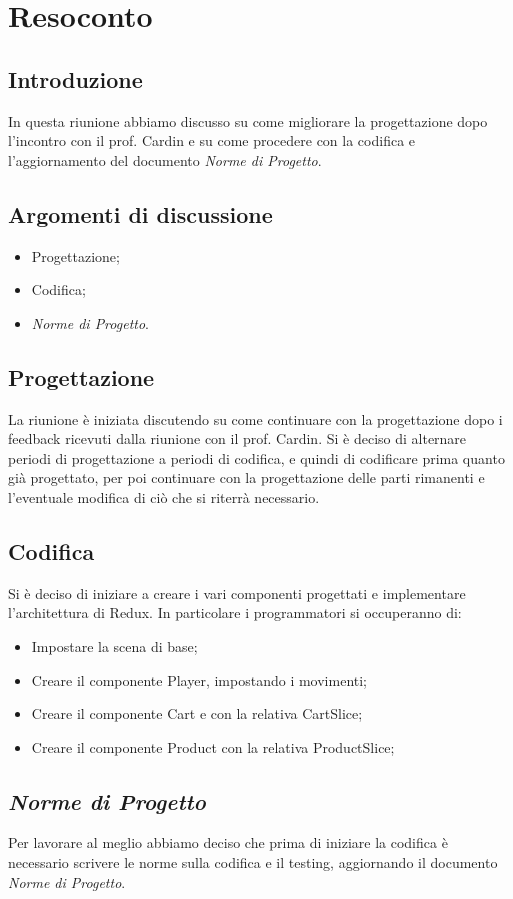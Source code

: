 \section{Resoconto}
\subsection{Introduzione}
In questa riunione abbiamo discusso su come migliorare la progettazione dopo l'incontro con il prof. Cardin e su come procedere con 
la codifica e l'aggiornamento del documento \textit{Norme di Progetto}.
\subsection{Argomenti di discussione}
\begin{itemize}
    \item Progettazione;
    \item Codifica;
    \item \textit{Norme di Progetto}.
\end{itemize}
\subsection{Progettazione}
La riunione è iniziata discutendo su come continuare con la progettazione dopo i feedback ricevuti dalla riunione con il prof. Cardin. Si è deciso di alternare periodi di progettazione a 
periodi di codifica, e quindi di codificare prima quanto già progettato, per poi continuare con la progettazione delle parti rimanenti e l'eventuale modifica di ciò che si riterrà necessario.

\subsection{Codifica}
Si è deciso di iniziare a creare i vari componenti progettati e implementare l'architettura di Redux. In particolare i programmatori si occuperanno di:
\begin{itemize}
    \item Impostare la scena di base;
    \item Creare il componente Player, impostando i movimenti;
    \item Creare il componente Cart e con la relativa CartSlice;
    \item Creare il componente Product con la relativa ProductSlice;
\end{itemize}
\subsection{\textit{Norme di Progetto}}
Per lavorare al meglio abbiamo deciso che prima di iniziare la codifica è necessario scrivere le norme sulla codifica e il testing, aggiornando il 
documento \textit{Norme di Progetto}.

